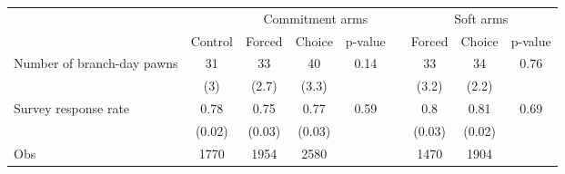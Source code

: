 \begin{tabular}{lcccccccc}
\toprule
      &       & \multicolumn{3}{c}{Commitment arms} &       & \multicolumn{3}{c}{Soft arms} \\
\cmidrule{3-5}\cmidrule{7-9}      & Control & Forced & Choice & p-value &       & Forced & Choice  & p-value \\
\midrule
\midrule
Number of branch-day pawns & 31    & 33    & 40    & 0.14  &       & 33    & 34    & 0.76 \\
      & (3)   & (2.7) & (3.3) &       &       & (3.2) & (2.2) &  \\
Survey response rate & 0.78  & 0.75  & 0.77  & 0.59  &       & 0.8   & 0.81  & 0.69 \\
      & (0.02) & (0.03) & (0.03) &       &       & (0.03) & (0.02) &  \\
\midrule
Obs   & 1770  & 1954  & 2580  &       &       & 1470  & 1904  &  \\
\bottomrule
\bottomrule
\end{tabular}%
